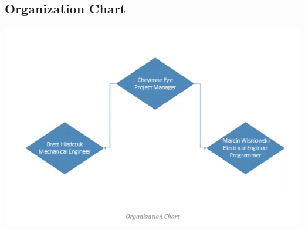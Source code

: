 \documentclass{article}
\begin{document}
\subsection{Organization Chart}
\includegraphics[width=\textwidth]{Organization_Chart.png}
\end{document}
